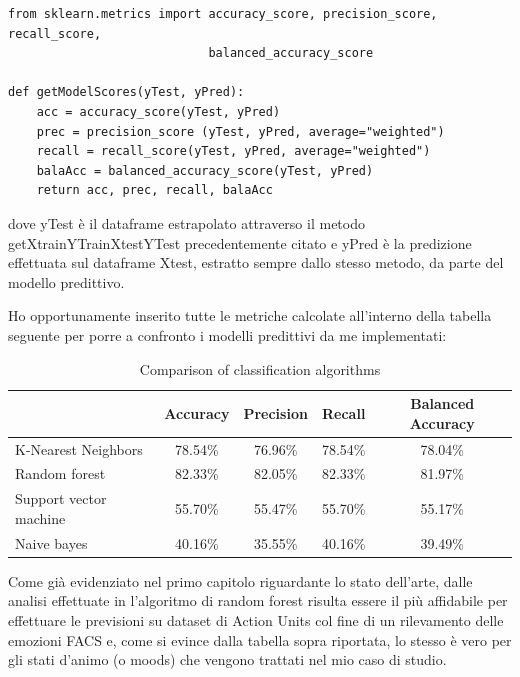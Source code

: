 \begin{verbatim} 
from sklearn.metrics import accuracy_score, precision_score, recall_score, 
                            balanced_accuracy_score 

def getModelScores(yTest, yPred):
    acc = accuracy_score(yTest, yPred)
    prec = precision_score (yTest, yPred, average="weighted") 
    recall = recall_score(yTest, yPred, average="weighted") 
    balaAcc = balanced_accuracy_score(yTest, yPred)
    return acc, prec, recall, balaAcc
\end{verbatim}
dove yTest è il dataframe estrapolato attraverso il metodo getXtrainYTrainXtestYTest precedentemente citato e yPred è la predizione effettuata sul dataframe Xtest, estratto sempre dallo stesso metodo, da parte del modello predittivo.

Ho opportunamente inserito tutte le metriche calcolate all’interno della tabella seguente per porre a confronto i modelli predittivi da me implementati:

\begin{table}[h]
\centering
\begin{tabular}{|l|c|c|c|c|}
\hline
& Accuracy & Precision & Recall & Balanced Accuracy \\
\hline
K-Nearest Neighbors & 78.54\% & 76.96\% & 78.54\% & 78.04\% \\
\hline
Random forest & 82.33\% & 82.05\% & 82.33\% & 81.97\% \\
\hline
Support vector machine & 55.70\% & 55.47\% & 55.70\% & 55.17\% \\
\hline
Naive bayes & 40.16\% & 35.55\% & 40.16\% & 39.49\% \\
\hline
\end{tabular}
\caption{Comparison of classification algorithms}
\label{tab:classification}
\end{table}

Come già evidenziato nel primo capitolo riguardante lo stato dell’arte, dalle analisi effettuate in \cite{FaceExpreRecoImgSeqTwoFoldRandomForestClass} l’algoritmo di random forest risulta essere il più affidabile per effettuare le previsioni su dataset di Action Units col fine di un rilevamento delle emozioni FACS e, come si evince dalla tabella sopra riportata, lo stesso è vero per gli stati d’animo (o moods) che vengono trattati nel mio caso di studio.